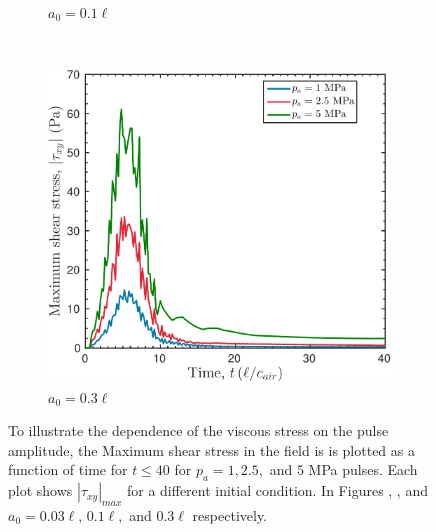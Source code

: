 \begin{figure}
\begin{subfigure}[b]{0.49\textwidth}
    \caption{\label{fig:stress_multi-pa_a10} $a_0 = 0.1\ell$}
  \end{subfigure}
  ~ 
  \begin{subfigure}[b]{0.49\textwidth}
    \includegraphics[width=\textwidth]{./figs/lung_figs/rmawave_1_A10,25,50_a30_tauxy_27-Feb-2017}
    \caption{\label{fig:stress_multi-pa_a30} $a_0 = 0.3\ell$}
  \end{subfigure}
  \caption{To illustrate the dependence of the viscous stress on the
    pulse amplitude, the Maximum shear stress in the field is is
    plotted as a function of time for $t\leq40$ for $p_a=1, 2.5,$ and
    $5$ MPa pulses. Each plot shows $\left|\tau_{xy}\right|_{max}$ for
    a different initial condition. In Figures
    ,
    , and
     $a_0=0.03\ell,\, 0.1\ell,$ and
    $0.3\ell$ respectively.}
  \label{fig:pa_dependence_stress}
\end{figure}
%
